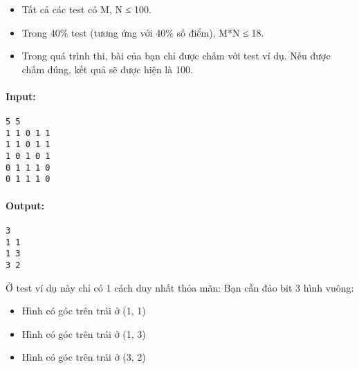 \begin{itemize}
	\item      Tất cả các test có M, N           ≤          100.    
	\item      Trong 40\% test (tương ứng với 40\% số điểm), M*N           ≤          18.    
	\item     Trong quá trình thi, bài của bạn chỉ được chấm với test ví dụ. Nếu được chấm đúng, kết quả sẽ được hiện là 100.   
\end{itemize}
\paragraph{    Input:   }
\begin{verbatim}
5 5
1 1 0 1 1
1 1 0 1 1
1 0 1 0 1
0 1 1 1 0
0 1 1 1 0\end{verbatim}

\paragraph{\textbf{    Output:   }}
\begin{verbatim}
3
1 1
1 3
3 2\end{verbatim}
Ở test ví dụ này chỉ có 1 cách duy nhất thỏa mãn: Bạn cần đảo bit 3 hình vuông:  
\begin{itemize}
	\item     Hình có góc trên trái ở (1, 1)   
	\item     Hình có góc trên trái ở (1, 3)   
	\item     Hình có góc trên trái ở (3, 2)   
\end{itemize}